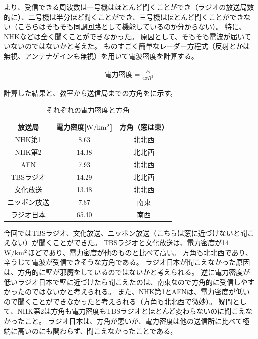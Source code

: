 \documentclass[report.tex]{subfiles}
\begin{document}
より、受信できる周波数は一号機はほとんど聞くことができ（ラジオの放送局数的に）、二号機は半分ほど聞くことができ、三号機はほとんど聞くことができない（こちらはそもそも同調回路として機能しているのか分からない）。
特に、NHKなどは全く聞くことができなかった。
原因として、そもそも電波が届いていないのではないかと考えた。
ものすごく簡単なレーダー方程式（反射とかは無視、アンテナゲインも無視）を用いて電波密度を計算する。

\begin{align}
	電力密度 = \frac{P_t}{4 \pi R^2} \label{eq:radar}
\end{align}

計算した結果と、教室から送信局までの方角をに示す。

\begin{table}[H]
	\centering
	\caption{それぞれの電力密度と方角}
	\label{tab:aaa}
	\begin{tabular}{ccc} \hline
		放送局    & 電力密度[\(\rm{W/km^2}\)] & 方角（窓は東） \\ \hline
		NHK第1  & 8.63                  & 北北西     \\
		NHK第2  & 14.38                 & 北北西     \\
		AFN    & 7.93                  & 北北西     \\
		TBSラジオ & 14.29                 & 北北西     \\
		文化放送   & 13.48                 & 北北西     \\
		ニッポン放送 & 7.87                  & 南東      \\
		ラジオ日本  & 65.40                 & 南西      \\ \hline
	\end{tabular}
\end{table}

今回ではTBSラジオ、文化放送、ニッポン放送（こちらは窓に近づけないと聞こえない）が聞くことができた。
TBSラジオと文化放送は、電力密度が14 \(\rm{W/km^2}\)ほどであり、電力密度が他のものと比べて高い。
方角も北北西であり、辛うじて電波が受信できそうな方角である。
ラジオ日本が聞こえなかった原因は、方角的に壁が邪魔をしているのではないかと考えられる。
逆に電力密度が低いラジオ日本で壁に近づけたら聞こえたのは、南東なので方角的に受信しやすかったのではないかと考えられる。
また、NHK第1とAFNは、電力密度が低いので聞くことができなかったと考えられる（方角も北北西で微妙）。
疑問として、NHK第2は方角も電力密度もTBSラジオとほとんど変わらないのに聞こえなかったこと。
ラジオ日本は、方角が悪いが、電力密度は他の送信所に比べて極端に高いのにも関わらず、聞こえなかったことである。
\end{document}
